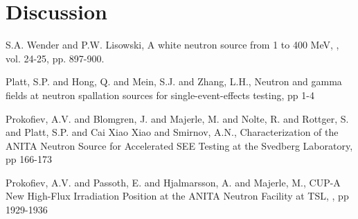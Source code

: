 \documentclass[11pt,a4paper]{IEEEtran}
\begin{document}
\section{Discussion}

\ifCLASSOPTIONcaptionsoff
  \newpage
\fi


\begin{thebibliography}{99} %

S.A. Wender and P.W. Lisowski,
\newblock A white neutron source from 1 to 400 MeV,										%
, vol. 24-25, pp. 897-900.					%

Platt, S.P. and Hong, Q. and Mein, S.J. and Zhang, L.H.,
\newblock Neutron and gamma fields at neutron spallation sources for single-event-effects testing,		%
 pp 1-4			%

Prokofiev, A.V. and Blomgren, J. and Majerle, M. and Nolte, R. and Rottger, S. and Platt, S.P. and Cai Xiao Xiao and Smirnov, A.N.,
\newblock Characterization of the ANITA Neutron Source for Accelerated SEE Testing at the Svedberg Laboratory,		%
 pp 166-173 									%

Prokofiev, A.V. and Passoth, E. and Hjalmarsson, A. and Majerle, M.,
\newblock CUP-A New High-Flux Irradiation Position at the ANITA Neutron Facility at TSL,		%
, pp 1929-1936 							%

\end{thebibliography}


\todos
\end{document}
